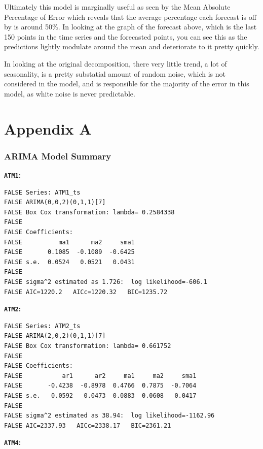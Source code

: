 \documentclass[openany]{book}
\begin{document}
Ultimately this model is marginally useful as seen by the Mean Absolute
Percentage of Error which reveals that the average percentage each
forecast is off by is around 50\%. In looking at the graph of the
forecast above, which is the last 150 points in the time series and the
forecasted points, you can see this as the predictions lightly modulate
around the mean and deteriorate to it pretty quickly.

In looking at the original decomposition, there very little trend, a lot
of seasonality, is a pretty substatial amount of random noise, which is
not considered in the model, and is responsible for the majority of the
error in this model, as white noise is never predictable.

\hypertarget{appendix-a}{%
\chapter*{Appendix A}\label{appendix-a}}

\hypertarget{arima-a}{%
\subsection*{ARIMA Model Summary}\label{arima-a}}

\textbf{\texttt{ATM1}:}

\begin{verbatim}
FALSE Series: ATM1_ts 
FALSE ARIMA(0,0,2)(0,1,1)[7] 
FALSE Box Cox transformation: lambda= 0.2584338 
FALSE 
FALSE Coefficients:
FALSE          ma1      ma2     sma1
FALSE       0.1085  -0.1089  -0.6425
FALSE s.e.  0.0524   0.0521   0.0431
FALSE 
FALSE sigma^2 estimated as 1.726:  log likelihood=-606.1
FALSE AIC=1220.2   AICc=1220.32   BIC=1235.72
\end{verbatim}

\textbf{\texttt{ATM2}:}

\begin{verbatim}
FALSE Series: ATM2_ts 
FALSE ARIMA(2,0,2)(0,1,1)[7] 
FALSE Box Cox transformation: lambda= 0.661752 
FALSE 
FALSE Coefficients:
FALSE           ar1      ar2     ma1     ma2     sma1
FALSE       -0.4238  -0.8978  0.4766  0.7875  -0.7064
FALSE s.e.   0.0592   0.0473  0.0883  0.0608   0.0417
FALSE 
FALSE sigma^2 estimated as 38.94:  log likelihood=-1162.96
FALSE AIC=2337.93   AICc=2338.17   BIC=2361.21
\end{verbatim}

\textbf{\texttt{ATM4}:}
\end{document}
